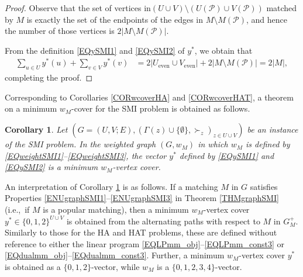 \documentclass[11pt,a4paper,showkeys]{article}
\theoremstyle{plain}
\newtheorem{corollary}[theorem]{Corollary}
\theoremstyle{definition}
\newcommand{\Ueven}{U_{\mathrm{even}}}
\newcommand{\Veven}{V_{\mathrm{even}}}
\begin{document}
\begin{proof}

    Observe that the set of vertices in$(U\cup V)\setminus (U(\mathcal{P})\cup  V(\mathcal{P}))$ matched by $M$ is 
    exactly the set of the endpoints of the edges in $M\setminus M(\mathcal{P})$, 
    and hence the number of those vertices is $2|M\setminus M(\mathcal{P})|$. 

    From the definition \eqref{EQySMI1} and \eqref{EQySMI2} of $y^*$, 
    we obtain that 
    \begin{align*}
        \sum_{u\in U} y^*(u) + \sum_{v\in V} y^*(v) 
        &{}= 2 |\Ueven \cup \Veven| + 2 |M\setminus M(\mathcal{P})|
        = 2|M|, 
    \end{align*}
    completing the proof. 
\end{proof}

Corresponding to Corollaries \ref{CORwcoverHA} and \ref{CORwcoverHAT}, 
a theorem on a minimum $w_M$-cover for the SMI problem is obtained as follows. 

\begin{corollary}
\label{CORwcoverSMI}
    Let $(G=(U,V;E),(\Gamma(z)\cup \{\emptyset\},\succ_z)_{z\in U\cup V})$ be an instance of the SMI problem. 
    In the weighted graph $(G,w_M)$ 
    in which $w_M$ is defined by \eqref{EQweightSMI1}--\eqref{EQweightSMI3}, 
    the vector $y^*$ defined by \eqref{EQySMI1} and \eqref{EQySMI2} is a minimum $w_M$-vertex cover. 
\end{corollary}


An interpretation of Corollary \ref{CORwcoverSMI} is as follows. 
If a matching $M$ in $G$ satisfies Properties \ref{ENUgraphSMI1}--\ref{ENUgraphSMI3} in Theorem \ref{THMgraphSMI} 
(i.e.,\ if $M$ is a popular matching), 
then 
a minimum $w_M$-vertex cover $y^*\in \{0,1,2\}^{U\cup V}$ is obtained from the alternating paths with respect to $M$ 
in $G_M^+$. 
Similarly to those for the HA and HAT problems, 
these are defined 
without reference to either the linear program \eqref{EQLPmm_obj}--\eqref{EQLPmm_const3} or \eqref{EQdualmm_obj}--\eqref{EQdualmm_const3}.
Further, 
a minimum $w_M$-vertex cover $y^*$ is obtained as a $\{0,1,2\}$-vector, 
while $w_M$ is a $\{0,1,2,3,4\}$-vector. 
\end{document}
